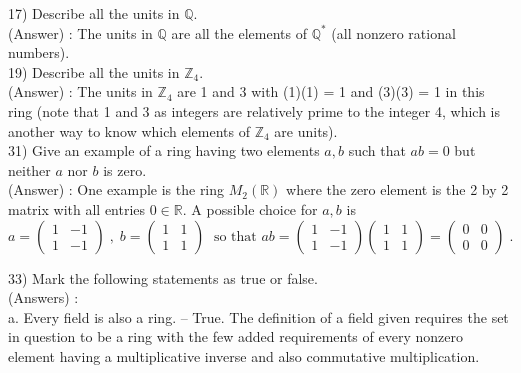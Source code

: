 \documentclass[12pt, letterpaper]{article}
\begin{document}
17) Describe all the units in $\mathbb{Q}$. \\

(Answer) : The units in $\mathbb{Q}$ are all the elements of $\mathbb{Q}^*$ (all nonzero rational numbers). \\

19) Describe all the units in $\mathbb{Z}_4$. \\

(Answer) : The units in $\mathbb{Z}_4$ are 1 and 3 with (1)(1) = 1 and (3)(3) = 1 in this ring (note that 1 and 3 as integers are relatively prime to the integer 4, which is another way to know which elements of $\mathbb{Z}_4$ are units). \\

31) Give an example of a ring having two elements $a,b$ such that $ab = 0$ but neither $a$ nor $b$ is zero. \\

(Answer) : One example is the ring $M_2(\mathbb{R})$ where the zero element is the 2 by 2 matrix with all entries $0 \in \mathbb{R}$. A possible choice for $a,b$ is 
$$ a = \begin{pmatrix}
1 & -1 \\ 1 &-1
\end{pmatrix}\; , \; b = \begin{pmatrix}
1 &1  \\ 1 &1
\end{pmatrix}\; \mbox{ so that } ab = \begin{pmatrix}
1 & -1 \\ 1 &-1
\end{pmatrix}\begin{pmatrix}
1 &1  \\ 1 &1
\end{pmatrix} = \begin{pmatrix}
0 & 0 \\ 0 &0
\end{pmatrix} \;.$$

33) Mark the following statements as true or false. \\

(Answers) : \\

a. Every field is also a ring. -- True. The definition of a field given requires the set in question to be a ring with the few added requirements of every nonzero element having a multiplicative inverse and also commutative multiplication. \\
\end{document}
